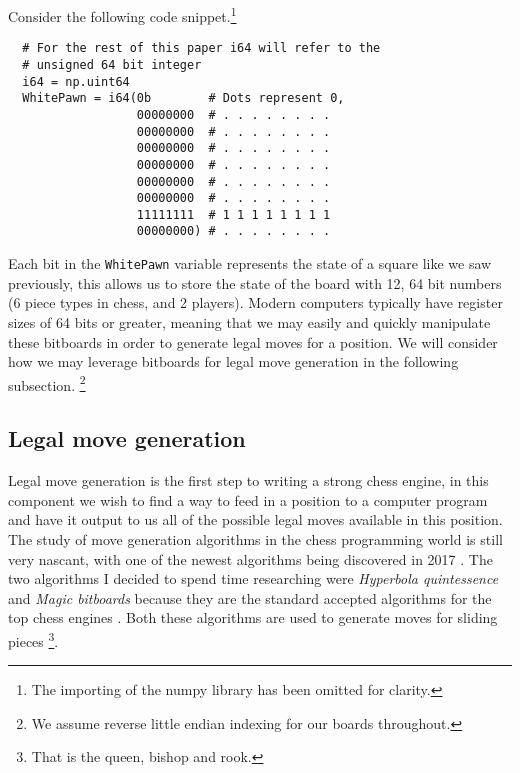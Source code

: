 Consider the following code snippet.\footnote{The importing
of the numpy library has been omitted for clarity.}

\begin{verbatim}
  # For the rest of this paper i64 will refer to the 
  # unsigned 64 bit integer
  i64 = np.uint64
  WhitePawn = i64(0b        # Dots represent 0,
                  00000000  # . . . . . . . .
                  00000000  # . . . . . . . .
                  00000000  # . . . . . . . .
                  00000000  # . . . . . . . .
                  00000000  # . . . . . . . .
                  00000000  # . . . . . . . .
                  11111111  # 1 1 1 1 1 1 1 1
                  00000000) # . . . . . . . .
\end{verbatim}

Each bit in the \texttt{WhitePawn} variable represents the
state of a square like we saw previously, this allows us to 
store the state of the board with 12, 64 bit numbers 
(6 piece types in chess, and 2 players). Modern computers
typically have register sizes of 64 bits or greater, 
meaning that we may easily and quickly manipulate these 
bitboards in order to generate legal moves for a position.
We will consider how we may leverage bitboards for legal 
move generation in the following subsection. 
\footnote{We assume reverse little endian indexing for 
our boards throughout.}

\subsection*{Legal move generation}
Legal move generation is the first step to writing a strong
chess engine, in this component we wish to 
find a way to feed in a position to a computer program and have it 
output to us all of the possible legal moves available in this position.
The study of move generation algorithms in the chess programming world 
is still very nascant, with one of the newest algorithms
being discovered in 2017 \cite{bm}. The two algorithms I
decided to spend time researching were
\textit{Hyperbola quintessence} and 
\textit{Magic bitboards} because they are the standard 
accepted algorithms for the top chess engines 
\cite{stockfish}. Both these algorithms are used to generate
moves for sliding pieces 
\footnote{That is the queen, bishop and rook.}.\\

